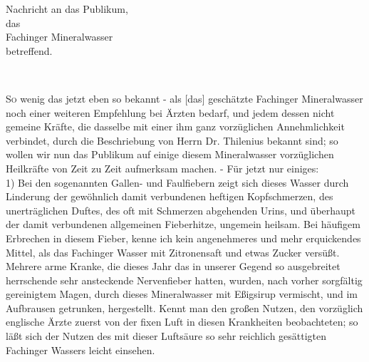 \documentclass[11pt,a5paper,twoside]{memoir}
\begin{document}
\newpage
{\centering
    {\Large Nachricht an das Publikum,}\\
    {\small das}\\
    \vspace{.5em}
    {\LARGE Fachinger Mineralwasser}\\
    {\small betreffend.}\\

    \begin{center}\begin{minipage}{4cm}
      \centering
      \hrulefill\\
    \end{minipage}\end{center}
}

\lettrine{S}o wenig das jetzt eben so bekannt -
als [das] geschätzte Fachinger Mineralwasser
noch einer weiteren Empfehlung bei Ärzten bedarf,
und jedem dessen nicht gemeine Kräfte,
die dasselbe mit einer ihm ganz vorzüglichen Annehmlichkeit verbindet,
durch die Beschriebung von Herrn Dr. Thilenius bekannt sind;
so wollen wir nun das Publikum
auf einige diesem Mineralwasser vorzüglichen Heilkräfte
von Zeit zu Zeit aufmerksam machen. -
Für jetzt nur einiges:\\

1) Bei den sogenannten Gallen- und Faulfiebern
zeigt sich dieses Wasser durch Linderung
der gewöhnlich damit verbundenen heftigen Kopfschmerzen,
des unerträglichen Duftes,
des oft mit Schmerzen abgehenden Urins,
und überhaupt der damit verbundenen allgemeinen Fieberhitze,
ungemein heilsam.
Bei häufigem Erbrechen in diesem Fieber,
kenne ich kein angenehmeres und mehr erquickendes Mittel,
als das Fachinger Wasser mit Zitronensaft und etwas Zucker versüßt.
Mehrere arme Kranke,
die dieses Jahr das in unserer Gegend
so ausgebreitet herrschende sehr ansteckende Nervenfieber hatten,
wurden, nach vorher sorgfältig gereinigtem Magen,
durch dieses Mineralwasser mit Eßigsirup vermischt,
und im Aufbrausen%
getrunken, hergestellt.
Kennt man den großen Nutzen,
den vorzüglich englische Ärzte
zuerst von der fixen Luft in diesen Krankheiten beobachteten;
so läßt sich der Nutzen
des mit dieser Luftsäure so sehr reichlich gesättigten Fachinger Wassers
leicht einsehen.\\
\end{document}

